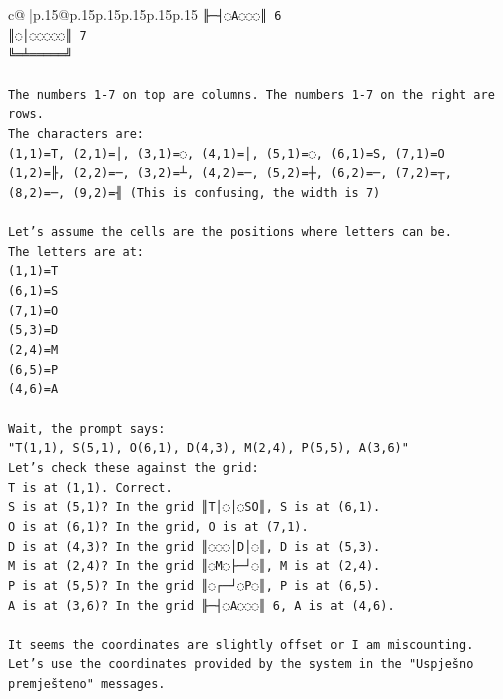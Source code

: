 \documentclass{article}
\begin{document}
{\begin{supertabular}{c@{$\;$}|p{.15\linewidth}@{}p{.15\linewidth}p{.15\linewidth}p{.15\linewidth}p{.15\linewidth}p{.15\linewidth}}
{{{\texttt{╟─┤◌A◌◌◌║ 6} \\
\texttt{║◌│◌◌◌◌◌║ 7} \\
\texttt{╚═╧═════╝} \\
\\ 
\texttt{The numbers 1{-}7 on top are columns. The numbers 1{-}7 on the right are rows.} \\
\texttt{The characters are:} \\
\texttt{(1,1)=T, (2,1)=│, (3,1)=◌, (4,1)=│, (5,1)=◌, (6,1)=S, (7,1)=O} \\
\texttt{(1,2)=╟, (2,2)=─, (3,2)=┴, (4,2)=─, (5,2)=┼, (6,2)=─, (7,2)=┬, (8,2)=─, (9,2)=╢ (This is confusing, the width is 7)} \\
\\ 
\texttt{Let's assume the cells are the positions where letters can be.} \\
\texttt{The letters are at:} \\
\texttt{(1,1)=T} \\
\texttt{(6,1)=S} \\
\texttt{(7,1)=O} \\
\texttt{(5,3)=D} \\
\texttt{(2,4)=M} \\
\texttt{(6,5)=P} \\
\texttt{(4,6)=A} \\
\\ 
\texttt{Wait, the prompt says:} \\
\texttt{"T(1,1), S(5,1), O(6,1), D(4,3), M(2,4), P(5,5), A(3,6)"} \\
\texttt{Let's check these against the grid:} \\
\texttt{T is at (1,1). Correct.} \\
\texttt{S is at (5,1)? In the grid ║T│◌│◌SO║, S is at (6,1).} \\
\texttt{O is at (6,1)? In the grid, O is at (7,1).} \\
\texttt{D is at (4,3)? In the grid ║◌◌◌│D│◌║, D is at (5,3).} \\
\texttt{M is at (2,4)? In the grid ║◌M◌├─┘◌║, M is at (2,4).} \\
\texttt{P is at (5,5)? In the grid ║◌┌─┘◌P◌║, P is at (6,5).} \\
\texttt{A is at (3,6)? In the grid ╟─┤◌A◌◌◌║ 6, A is at (4,6).} \\
\\ 
\texttt{It seems the coordinates are slightly offset or I am miscounting.} \\
\texttt{Let's use the coordinates provided by the system in the "Uspješno premješteno" messages.} \\
}}}
\end{supertabular}}
\end{document}
